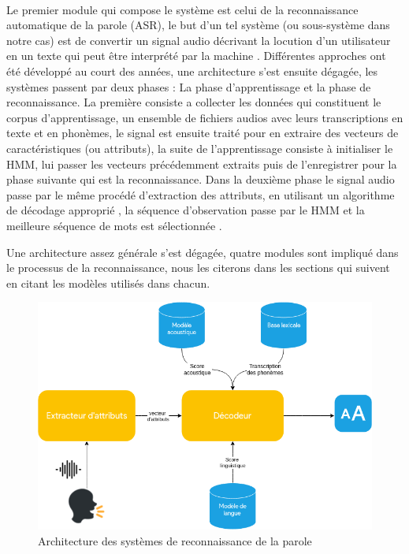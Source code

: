 	\paragraph{}
	Le premier module qui compose le système est celui de la reconnaissance automatique de la parole (ASR), le but d'un tel système (ou sous-système dans notre cas) est de convertir un signal audio décrivant la locution d'un utilisateur en un texte qui peut être interprété par la machine \cite{asr_definition}. Différentes approches ont été développé au court des années, une architecture s'est ensuite dégagée, les systèmes passent par deux phases : La phase d'apprentissage et la phase de reconnaissance. La première consiste a collecter les données qui constituent le corpus d'apprentissage, un ensemble de fichiers audios avec leurs transcriptions en texte et en phonèmes, le signal est ensuite traité pour en extraire des vecteurs de caractéristiques (ou attributs), la suite de l'apprentissage consiste à initialiser le HMM, lui passer les vecteurs précédemment extraits puis de l'enregistrer pour la phase suivante qui est la reconnaissance. Dans la deuxième phase le signal audio passe par le même procédé d'extraction des attributs, en utilisant un algorithme de décodage approprié \cite{viterbi_hmm}, la séquence d'observation passe par le HMM et la meilleure séquence de mots est sélectionnée \cite{speech_reco_Yu2015}.
	\par Une architecture assez générale s'est dégagée, quatre modules sont impliqué dans le processus de la reconnaissance, nous les citerons dans les sections qui suivent en citant les modèles utilisés dans chacun.
	
	\begin{figure}[H]
		\centering
		\label{ASR_schema}
		\includegraphics[width=0.75\linewidth]{images/ASR/schema.png}
		\caption{Architecture des systèmes de reconnaissance de la parole \cite{speech_reco_Yu2015}}
	\end{figure}
	
